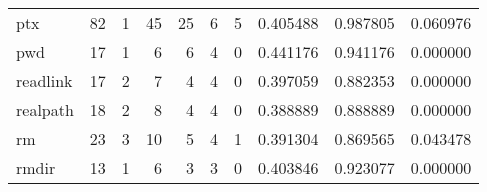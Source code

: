 \begin{longtable}{lrrrrrrrrr}
ptx       &                                       82 &                                                  1 &                                                 45 &                                                 25 &                                                  6 &                                                  5 &                                           0.405488 &                               0.987805 &                             0.060976 \\
pwd       &                                       17 &                                                  1 &                                                  6 &                                                  6 &                                                  4 &                                                  0 &                                           0.441176 &                               0.941176 &                             0.000000 \\
readlink  &                                       17 &                                                  2 &                                                  7 &                                                  4 &                                                  4 &                                                  0 &                                           0.397059 &                               0.882353 &                             0.000000 \\
realpath  &                                       18 &                                                  2 &                                                  8 &                                                  4 &                                                  4 &                                                  0 &                                           0.388889 &                               0.888889 &                             0.000000 \\
rm        &                                       23 &                                                  3 &                                                 10 &                                                  5 &                                                  4 &                                                  1 &                                           0.391304 &                               0.869565 &                             0.043478 \\
rmdir     &                                       13 &                                                  1 &                                                  6 &                                                  3 &                                                  3 &                                                  0 &                                           0.403846 &                               0.923077 &                             0.000000 \\

\end{longtable}

